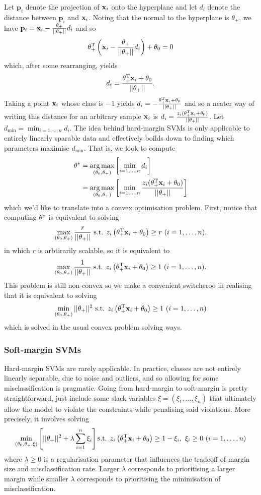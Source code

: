 \documentclass[11pt]{article}
\begin{document}
\noindent Let $\mathbf{p}_i$ denote the projection of $\mathbf{x}_i$ onto the hyperplane and let $d_i$ denote the distance between $\mathbf{p}_i$ and $\mathbf{x}_i$. Noting that the normal to the hyperplane is $\theta_+$, we have $\mathbf{p}_i=\mathbf{x}_i-\frac{\theta_+}{||\theta_+||}d_i$ and so
$$
\theta_+^{\text{T}}\left(\mathbf{x}_i-\frac{\theta_+}{||\theta_+||}d_i\right)+\theta_0
=
0
$$
which, after some rearranging, yields
$$
d_i
=
\frac{\theta_+^{\text{T}}\mathbf{x}_i+\theta_0}{||\theta_+||}.
$$
Taking a point $\mathbf{x}_i$ whose class is $-1$ yields $d_i=-\frac{\theta_+^{\text{T}}\mathbf{x}_i+\theta_0}{||\theta_+||}$ and so a neater way of writing this distance for an arbitrary sample $\mathbf{x}_i$ is $d_i=\frac{z_i(\theta_+^{\text{T}}\mathbf{x}_i+\theta_0)}{||\theta_+||}$. Let $d_{\text{min}}=\min_{i=1,\dots,n}d_i$. The idea behind hard-margin SVMs is only applicable to entirely linearly sparable data and effectively boilds down to finding which parameters maximise $d_{\text{min}}$. That is, we look to compute
\begin{align*}
    \theta^{*}
    &=
    \operatorname*{arg\,max}_{(\theta_0,\theta_+)}\left[\min_{i=1,\dots,n}d_i\right]\\
    &=
    \operatorname*{arg\,max}_{(\theta_0,\theta_+)}\left[\min_{i=1,\dots,n}\frac{z_i(\theta_+^{\text{T}}\mathbf{x}_i+\theta_0)}{||\theta_+||}\right]\\
\end{align*}
which we'd like to translate into a convex optimisation problem. First, notice that computing $\theta^{*}$ is equivalent to solving
$$
\max_{(\theta_0,\theta_+)}\frac{r}{||\theta_+||}\text{ s.t. } z_i\left(\theta_+^{\text{T}}\mathbf{x}_i+\theta_0\right)\geq r\text{ } (i=1,\dots,n).
$$
in which $r$ is arbtirarily scalable, so it is equivalent to
$$
\max_{(\theta_0,\theta_+)}\frac{1}{||\theta_+||}\text{ s.t. } z_i\left(\theta_+^{\text{T}}\mathbf{x}_i+\theta_0\right)\geq 1\text{ } (i=1,\dots,n).
$$
This problem is still non-convex so we make a convenient switcheroo in realising that it is equivalent to solving
$$
\min_{(\theta_0,\theta_+)}||\theta_+||^2\text{ s.t. } z_i\left(\theta_+^{\text{T}}\mathbf{x}_i+\theta_0\right)\geq 1\text{ } (i=1,\dots,n)
$$
which is solved in the usual convex problem solving ways.

\subsubsection{Soft-margin SVMs}

Hard-margin SVMs are rarely applicable. In practice, classes are not entirely linearly separable, due to noise and outliers, and so allowing for some misclassification is pragmatic. Going from hard-margin to soft-margin is pretty straightforward, just include some slack variables $\xi=(\xi_1,\dots,\xi_n)$ that ultimately allow the model to violate the constraints while penalising said violations. More precisely, it involves solving
$$
\min_{(\theta_0,\theta_+,\xi)}\left[||\theta_+||^2+\lambda\sum_{i=1}^n\xi_i\right]\text{s.t. } z_i\left(\theta_+^{\text{T}}\mathbf{x}_i+\theta_0\right)\geq 1-\xi_i,\text{ }\xi_i\geq0\text{ } (i=1,\dots,n)
$$
where $\lambda\geq0$ is a regularisation parameter that influences the tradeoff of margin size and misclassification rate. Larger $\lambda$ corresponds to prioritising a larger margin while smaller $\lambda$ corresponds to prioritising the minimisation of misclassification.
\end{document}
